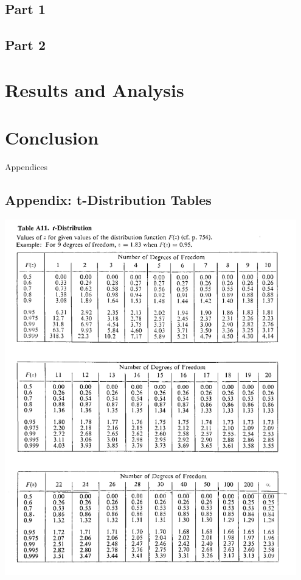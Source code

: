 \documentclass{article}
\begin{document}
\subsection{Part 1}


\subsection{Part 2}


\section{Results and Analysis}



\section{Conclusion}




\newpage
\thispagestyle{empty}  %
\begin{center}
	\vspace*{\fill}
	{\Huge Appendices}
	\vspace*{\fill}
\end{center}

\newpage
\begin{appendices}
\pagestyle{fancy}
\renewcommand{\thefigure}{A\arabic{figure}}
\setcounter{figure}{0}

\section*{Appendix: t-Distribution Tables}
\includegraphics[width=0.95\textwidth]{Lab 1/t_distribution_Table_lecture3.png}
\end{appendices}
\end{document}
